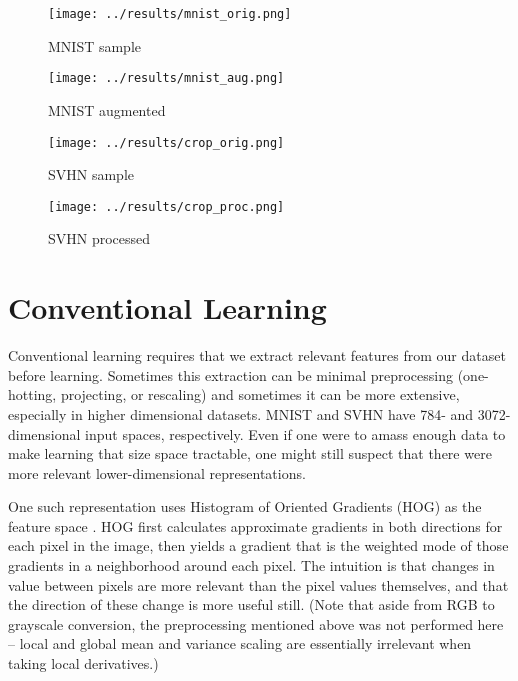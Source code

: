 \documentclass{article}
\begin{document}
\begin{figure}[htbp]
  \centering
  \texttt{[image: ../results/mnist\_orig.png]}
  \caption{MNIST sample}
  \label{fig:mnist_orig}
\end{figure}

\begin{figure}[htbp]
  \centering
  \texttt{[image: ../results/mnist\_aug.png]}
  \caption{MNIST augmented}
  \label{fig:mnist_aug}
\end{figure}

\begin{figure}[htbp]
  \centering
  \texttt{[image: ../results/crop\_orig.png]}
  \caption{SVHN sample}
  \label{fig:crop_orig}
\end{figure}

\begin{figure}[htbp]
  \centering
  \texttt{[image: ../results/crop\_proc.png]}
  \caption{SVHN processed}
  \label{fig:crop_proc}
\end{figure}

\section{Conventional Learning}

Conventional learning requires that we extract relevant features from our dataset before learning. Sometimes this extraction can be minimal preprocessing (one-hotting, projecting, or rescaling) and sometimes it can be more extensive, especially in higher dimensional datasets. MNIST and SVHN have 784- and 3072-dimensional input spaces, respectively. Even if one were to amass enough data to make learning that size space tractable, one might still suspect that there were more relevant lower-dimensional representations.

One such representation uses Histogram of Oriented Gradients (HOG) as the feature space \cite{netzer2011reading}.  HOG first calculates approximate gradients in both directions for each pixel in the image, then yields a gradient that is the weighted mode of those gradients in a neighborhood around each pixel. The intuition is that changes in value between pixels are more relevant than the pixel values themselves, and that the direction of these change is more useful still.  (Note that aside from RGB to grayscale conversion, the preprocessing mentioned above was not performed here -- local and global mean and variance scaling are essentially irrelevant when taking local derivatives.)
\end{document}
